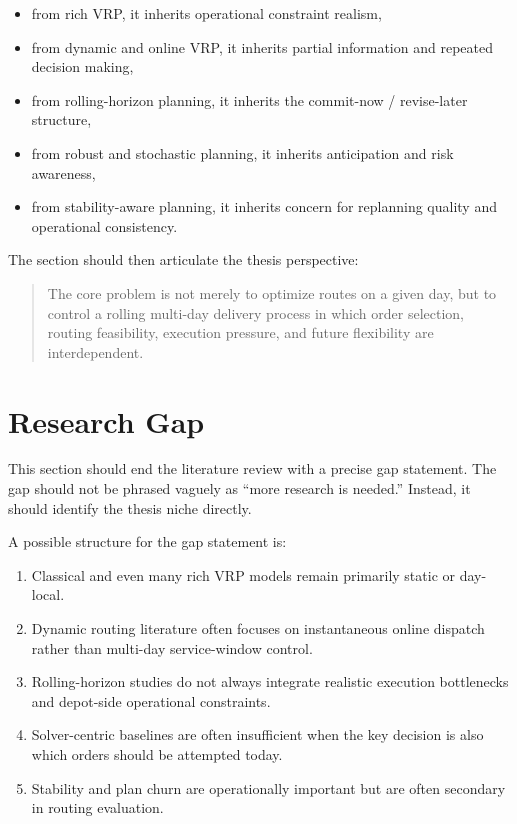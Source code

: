 \begin{itemize}
    \item from rich VRP, it inherits operational constraint realism,
    \item from dynamic and online VRP, it inherits partial information and repeated decision making,
    \item from rolling-horizon planning, it inherits the commit-now / revise-later structure,
    \item from robust and stochastic planning, it inherits anticipation and risk awareness,
    \item from stability-aware planning, it inherits concern for replanning quality and operational consistency.
\end{itemize}

The section should then articulate the thesis perspective:

\begin{quote}
The core problem is not merely to optimize routes on a given day, but to control a rolling multi-day delivery process in which order selection, routing feasibility, execution pressure, and future flexibility are interdependent.
\end{quote}

\section{Research Gap}

This section should end the literature review with a precise gap statement. The gap should not be phrased vaguely as ``more research is needed.'' Instead, it should identify the thesis niche directly.

A possible structure for the gap statement is:

\begin{enumerate}
    \item Classical and even many rich VRP models remain primarily static or day-local.
    \item Dynamic routing literature often focuses on instantaneous online dispatch rather than multi-day service-window control.
    \item Rolling-horizon studies do not always integrate realistic execution bottlenecks and depot-side operational constraints.
    \item Solver-centric baselines are often insufficient when the key decision is also which orders should be attempted today.
    \item Stability and plan churn are operationally important but are often secondary in routing evaluation.
\end{enumerate}

